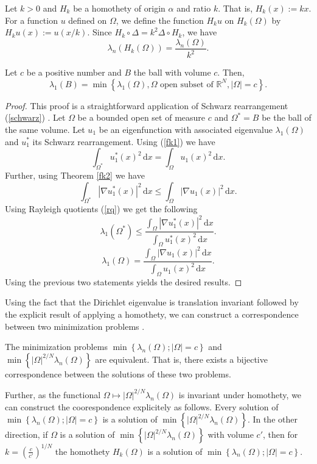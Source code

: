 Let $k > 0$ and $H_{k}$ be a homothety of origin $\alpha$ and ratio $k$.
That is, $H_{k}(x) := kx$.
For a function $u$ defined on  $\Omega$, we define the function $H_{k}u$ on $H_{k}(\Omega)$ by $H_{k}u(x) := u(x/k)$.
Since $H_{k} \circ \Delta = k^2 \Delta \circ H_{k}$, we have
\[
\lambda_{n}(H_{k}(\Omega)) = \frac{\lambda_{n}(\Omega)}{k^2}
.\] 
\begin{theorem} \label{fk}
 Let $c$ be a positive number and $B$ the ball with volume $c$. Then,
 \[
   \lambda_{1}(B) = \min \left\{ \lambda_{1}(\Omega), \Omega \text{ open subset of } \mathbb{R}^{N}, |\Omega| = c \right\} 
 .\] 
\end{theorem}
\begin{proof}
  This proof is a straightforward application of Schwarz rearrangement (\ref{schwarz}) \cite{henrot}.
  Let $\Omega$ be a bounded open set of measure $c$ and $\Omega^* = B$ be the ball of the same volume.
  Let $u_1$ be an eigenfunction with associated eigenvalue $\lambda_{1}(\Omega)$ and $u_1^*$ its Schwarz rearrangement.
  Using (\ref{fk1}) we have
  \[
   \int_{\Omega^{*}} \! u_1^{*}(x)^2 \, \mathrm{d}x = \int_{ \Omega} \! u_1(x)^2 \, \mathrm{d}x
  .\] 
  Further, using Theorem \ref{fk2} we have
  \[
     \int_{\Omega^{*}} \! | \nabla u_1^{*}(x) |^2 \, \mathrm{d}x \leq \int_\Omega \! | \nabla u_1(x)  |^2  \, \mathrm{d}x
  .\] 
  Using Rayleigh quotients (\ref{rq}) we get the following
  \[
    \lambda_{1}(\Omega^{*}) \leq \frac{\int_{\Omega} \! | \nabla u_1^{*}(x) |^2 \, \mathrm{d}x }{\int_{\Omega} \! u_1^{*}(x)^2 \, \mathrm{d}x }
  .\] 
  \[
    \lambda_{1}(\Omega) = \frac{\int_{ \Omega} \! | \nabla u_1(x) | ^2 \, \mathrm{d}x }{\int_{ \Omega} \! u_1(x)^2 \, \mathrm{d}x}
  .\] 
  Using the previous two statements yields the desired results.
\end{proof}
Using the fact that the Dirichlet eigenvalue is translation invariant followed by the explicit result of applying a homothety, we can construct a correspondence between two minimization problems \cite{henrot}.
\begin{theorem} \label{eqmin}
The minimization problems $\min \left\{ \lambda_{n}(\Omega); |\Omega| = c \right\} $ and \\ $\min \left\{ |\Omega|^{2/N}  \lambda_{n}(\Omega) \right\} $ are equivalent.
That is, there exists a bijective correspondence between the solutions of these two problems.
\end{theorem}
Further, as the functional $\Omega \mapsto | \Omega |^{2 / N} \lambda_{n}(\Omega) $ is invariant under homothety, we can construct the coorespondence explicitely as follows.
Every solution of \\ $\min \left\{ \lambda_{n}(\Omega); |\Omega| = c \right\} $ is a solution of $\min \left\{ |\Omega|^{2/N}  \lambda_{n}(\Omega) \right\} $.
In the other direction, if $\Omega$ is a solution of $\min \left\{ |\Omega|^{2/N}  \lambda_{n}(\Omega) \right\} $ with volume $c'$, then for $k = \left( \frac{c}{c'} \right)^{1 / N}$ the homothety $H_{k}(\Omega)$ is a solution of $\min \left\{ \lambda_{n}(\Omega); |\Omega| = c \right\} $.

